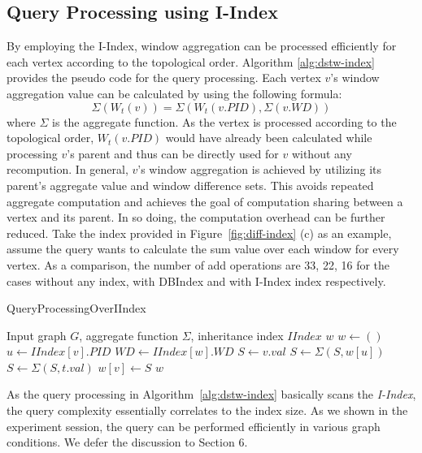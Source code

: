 \subsection{Query Processing using I-Index}

By employing the I-Index, window aggregation can be processed efficiently 
for each vertex according to 
the topological order. Algorithm \ref{alg:dstw-index} 
provides the pseudo code for the query processing. 
Each vertex $v$'s window aggregation value can be calculated 
by using the following formula: 
\begin{equation}
\Sigma (W_t(v)) = \Sigma (W_t(v.PID),\Sigma(v.WD))
\end{equation}
where $\Sigma$ is the aggregate function. As the vertex is 
processed according to the topological order, $W_t(v.PID)$ 
would have already been calculated while processing $v$'s parent and 
thus can be directly used for $v$ without any recompution. 
In general, $v$'s window aggregation is achieved by utilizing its 
parent's aggregate value and window difference sets. 
This avoids repeated aggregate computation and achieves 
the goal of computation sharing between a vertex and its parent. 
In so doing, the computation overhead can be further reduced. 
Take the index  provided in Figure~\ref{fig:diff-index} (c) as an example, 
assume the query wants to calculate the sum value over each window 
for every vertex. As a comparison, the number of add operations 
are 33, 22, 16 for the cases without any index, 
with DBIndex and with I-Index index respectively. 


\begin{algorithm}
\caption{QueryProcessingOverIIndex}
\begin{algorithmic}[1]
\Require Input graph $G$, aggregate function $\Sigma$, inheritance index $IIndex$ 
\Ensure $w$ 
\State $w \leftarrow ()$
 \label{code:dstw-index-tp1}
	\State $u \leftarrow IIndex[v].PID$
	\State $WD \leftarrow IIndex[w].WD$
	\State $S \leftarrow v.val$
	\State $S \leftarrow \Sigma(S, w[u])$
	 \label{code:dstw-index-tp2}
		\State $S\leftarrow \Sigma(S, t.val)$
	\EndFor
	\State $w[v] \leftarrow S$
\EndFor
\Return $w$
\end{algorithmic}
\label{alg:dstw-index}
\end{algorithm}

As the query processing in Algorithm~\ref{alg:dstw-index} basically scans the \emph{I-Index}, the query
complexity essentially correlates to the index size. As we shown in the experiment session, the query can be performed efficiently 
in various graph conditions. We defer the discussion to Section 6.


